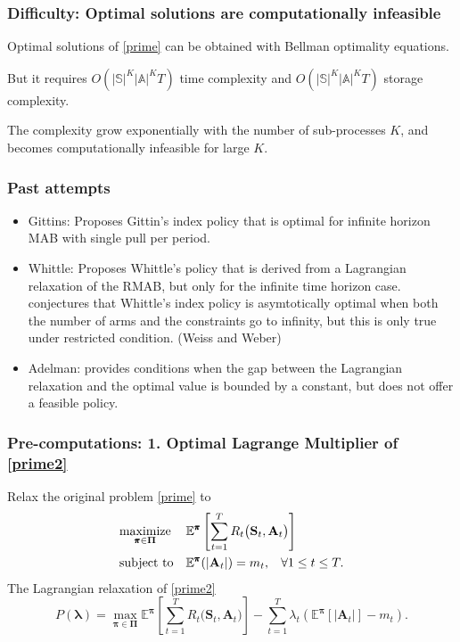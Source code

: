 \documentclass{beamer}
\newcommand{\lambdav}{\pmb{\lambda}}
\newcommand{\allp}{\pmb{\pi}}
\newcommand{\allpset}{\mathbf{\Pi}}
\newcommand{\allstater}{\mathbf{S}}
\newcommand{\allar}{\mathbf{A}}
\newcommand{\allr}{R}
\newcommand{\substates}{\mathbb{S}}
\newcommand{\subactions}{\mathbb{A}}
\begin{document}
\begin{frame}
\frametitle{Difficulty: Optimal solutions are computationally infeasible}
Optimal solutions of \eqref{prime} can be obtained with Bellman optimality equations.

\vspace{0.5cm}
But it requires $O(|\substates|^K|\subactions|^KT)$ time complexity and $O(|\substates|^K|\subactions|^KT)$ storage complexity.

\vspace{0.5cm}
The complexity grow exponentially with the number of sub-processes $K$, and becomes computationally infeasible for large $K$.
\end{frame}

\begin{frame}
\frametitle{Past attempts}
\begin{itemize}
\item Gittins: Proposes Gittin's index policy that is optimal for infinite horizon MAB with single pull per period.
\item Whittle: Proposes Whittle's policy that is derived from a Lagrangian relaxation of the RMAB, but only for the infinite time horizon case.\\
conjectures that Whittle's index policy is asymtotically optimal when both the number of arms and the constraints go to infinity, but this is only true under restricted condition. (Weiss and Weber)
\item Adelman: provides conditions when the gap between the Lagrangian relaxation and the optimal value is bounded by a constant, but does not offer a feasible policy.
\end{itemize}


\end{frame}

\begin{frame}
\frametitle{Pre-computations: 1. Optimal Lagrange Multiplier of \eqref{prime2}}
Relax the original problem \eqref{prime} to
\begin{equation}\label{prime2}
\begin{aligned}
& \underset{\allp\in\allpset}{\text{maximize}}
& & \mathbb{E}^{\allp}\left[\sum_{t=1}^{T}\allr_t\big(\allstater_t,\allar_t\big)\right] \\
& \text{subject to}
& & \mathbb{E}^{\allp}(|\allar_t|)=m_t, \hspace{3mm}\forall 1\leq t\leq T .
\end{aligned}
\end{equation}
The Lagrangian relaxation of \eqref{prime2}
\begin{equation}\label{ub}
 P(\lambdav)=\max_{\allp\in \allpset}\mathbb{E}^{\allp}\left[\sum_{t=1}^{T}\allr_t\big(\allstater_t,\allar_t\big)\right]-\sum_{t=1}^T\lambda_t\left(\mathbb{E}^{\allp}[|\allar_t|]-m_t\right).
 \end{equation} 
\end{frame}
\end{document}
